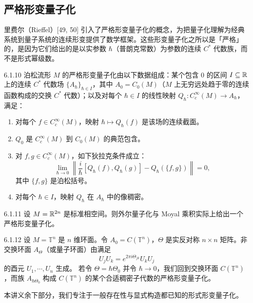 \subsection{严格形变量子化}

里费尔（Rieffel）[49, 50] 引入了严格形变量子化的概念，为把量子化理解为经典系统到量子系统的连续形变提供了数学框架。这些形变量子化之所以是「严格」的，是因为它们给出的是以实参数 $\hbar$（普朗克常数）为参数的连续 $C^*$ 代数族，而不是形式幂级数。

\begin{definition}{6.1.10}
  泊松流形 $M$ 的严格形变量子化由以下数据组成：某个包含 $0$ 的区间 $I\subseteq\mathbb{R}$ 上的连续 $C^*$ 代数场 $\{A_\hbar\}_{\hbar\in I}$，其中 $A_0=C_0(M)$（$M$ 上无穷远处趋于零的连续函数构成的交换 $C^*$ 代数）；以及对每个 $\hbar\in I$ 的线性映射 $Q_\hbar:C_c^\infty(M)\to A_\hbar$，满足：
  \begin{enumerate}[label=\arabic*.,leftmargin=2.2em,itemsep=0.2em]
  \item 对每个 $f\in C_c^\infty(M)$，映射 $\hbar\mapsto Q_\hbar(f)$ 是该场的连续截面。
  \item $Q_0$ 是 $C_c^\infty(M)$ 到 $C_0(M)$ 的典范包含。
  \item 对 $f,g\in C_c^\infty(M)$，如下狄拉克条件成立：
  \[
  \lim_{\hbar\to0}\left\|\frac{i}{\hbar}[Q_\hbar(f),Q_\hbar(g)]
  -Q_\hbar(\{f,g\})\right\|=0,
  \]
  其中 $\{f,g\}$ 是泊松括号。
  \item 对每个 $\hbar\in I$，映射 $Q_\hbar$ 在 $A_\hbar$ 中的像稠密。
  \end{enumerate}
\end{definition}

\begin{example}{6.1.11}
  设 $M=\mathbb{R}^{2n}$ 是标准相空间。则外尔量子化与 Moyal 乘积实际上给出一个严格形变量子化。
\end{example}

\begin{example}{6.1.12}
  设 $M=\mathbb{T}^n$ 是 $n$ 维环面。令 $A_0=C(\mathbb{T}^n)$，$\Theta$ 是实反对称 $n\times n$ 矩阵。非交换环面 $A_\Theta$（或量子环面）由满足
  \[
  U_jU_k=e^{2\pi i\Theta_{jk}}U_kU_j
  \]
  的酉元 $U_1,\cdots,U_n$ 生成。
  若令 $\Theta=\hbar\Theta_0$ 并令 $\hbar\to0$，我们回到交换环面 $C(\mathbb{T}^n)$，而族 $A_{\hbar\Theta_0}$ 构成 $C(\mathbb{T}^n)$ 的某个合适稠密子代数的严格形变量子化。
\end{example}

本讲义余下部分，我们专注于一般存在性与显式构造都已知的形式形变量子化。


